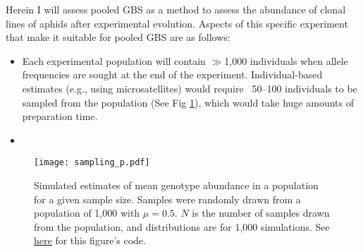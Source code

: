 Herein I will assess pooled GBS as a method to assess the abundance of clonal lines of
aphids after experimental evolution.
Aspects of this specific experiment that make it suitable for pooled GBS are as follows:
\begin{itemize}
    \item Each experimental population will contain $\gg$1,000 individuals when allele 
        frequencies are sought at the end of the experiment.
        Individual-based estimates (e.g., using microsatellites) would require ~50--100 
        individuals to be sampled from the population (See Fig \ref{fig:sampling}), which
        would take huge amounts of preparation time.
    \item 
\end{itemize}



\begin{figure}[!htbp]
    \centering
    \texttt{[image: sampling\_p.pdf]}
    \caption{Simulated estimates of mean genotype abundance in a population for a given
        sample size. Samples were randomly drawn from a population of 1,000 with 
        $\mu = 0.5$. $N$ is the number of samples drawn from the population, and 
        distributions are for 1,000 simulations.
        See \href{https://github.com/lucasnell/mol_ecol/samp_plot.R}{here} for this 
        figure's code.}
    \label{fig:sampling}
\end{figure}




